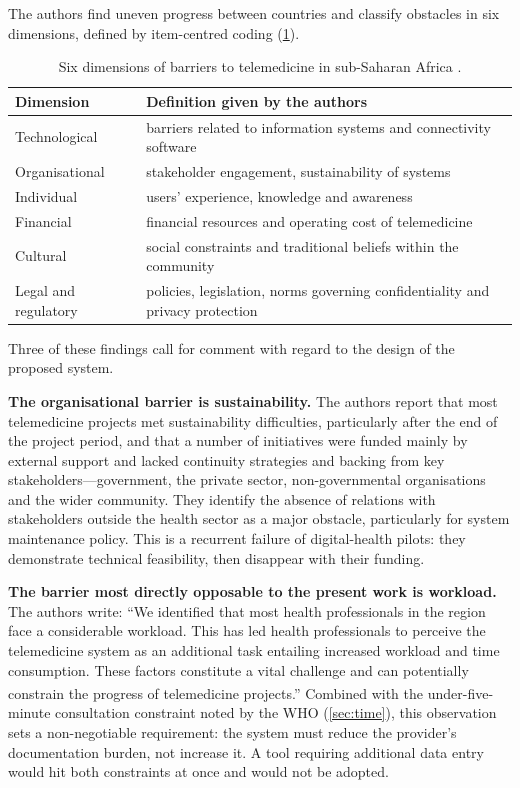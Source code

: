 \documentclass[12pt,a4paper,oneside]{report}
\newcommand{\bq}[1]{``#1''\textsuperscript{\dag}}
\begin{document}
The authors find uneven progress between countries and classify obstacles in six dimensions, defined by item-centred coding (\cref{tab:barriers}).

\begin{table}[htbp]
\centering\small
\caption{Six dimensions of barriers to telemedicine in sub-Saharan Africa \parencite{dodoo2022}.}\label{tab:barriers}
\begin{tabularx}{\textwidth}{@{}>{\raggedright\arraybackslash}p{3.4cm} X@{}}
\toprule
\textbf{Dimension} & \textbf{Definition given by the authors} \\
\midrule
Technological & barriers related to information systems and connectivity software \\
Organisational & stakeholder engagement, sustainability of systems \\
Individual & users' experience, knowledge and awareness \\
Financial & financial resources and operating cost of telemedicine \\
Cultural & social constraints and traditional beliefs within the community \\
Legal and regulatory & policies, legislation, norms governing confidentiality and privacy protection \\
\bottomrule
\end{tabularx}
\end{table}

Three of these findings call for comment with regard to the design of the proposed system.

\textbf{The organisational barrier is sustainability.} The authors report that most telemedicine projects met sustainability difficulties, particularly after the end of the project period, and that a number of initiatives were funded mainly by external support and lacked continuity strategies and backing from key stakeholders---government, the private sector, non-governmental organisations and the wider community. They identify the absence of relations with stakeholders outside the health sector as a major obstacle, particularly for system maintenance policy. This is a recurrent failure of digital-health pilots: they demonstrate technical feasibility, then disappear with their funding.

\textbf{The barrier most directly opposable to the present work is workload.} The authors write: \bq{We identified that most health professionals in the region face a considerable workload. This has led health professionals to perceive the telemedicine system as an additional task entailing increased workload and time consumption. These factors constitute a vital challenge and can potentially constrain the progress of telemedicine projects.} Combined with the under-five-minute consultation constraint noted by the WHO (\cref{sec:time}), this observation sets a non-negotiable requirement: the system must reduce the provider's documentation burden, not increase it. A tool requiring additional data entry would hit both constraints at once and would not be adopted.
\end{document}

